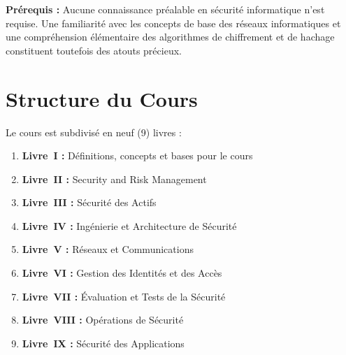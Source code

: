 \textbf{Prérequis :} Aucune connaissance préalable en sécurité informatique n'est requise. Une familiarité avec les concepts de base des réseaux informatiques et une compréhension élémentaire des algorithmes de chiffrement et de hachage constituent toutefois des atouts précieux.

\section*{Structure du Cours}

Le cours est subdivisé en neuf (9) livres :

\begin{enumerate}
    \item \textbf{Livre~I :} Définitions, concepts et bases pour le cours
    \item \textbf{Livre~II :} Security and Risk Management
    \item \textbf{Livre~III :} Sécurité des Actifs
    \item \textbf{Livre~IV :} Ingénierie et Architecture de Sécurité
    \item \textbf{Livre~V :} Réseaux et Communications
    \item \textbf{Livre~VI :} Gestion des Identités et des Accès
    \item \textbf{Livre~VII :} Évaluation et Tests de la Sécurité
    \item \textbf{Livre~VIII :} Opérations de Sécurité
    \item \textbf{Livre~IX :} Sécurité des Applications
\end{enumerate}
